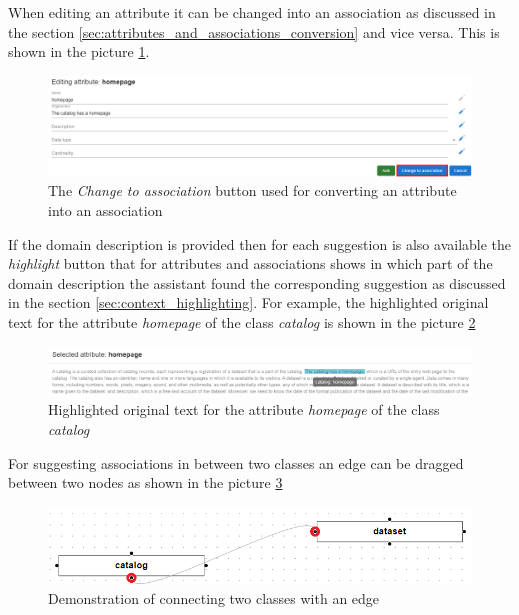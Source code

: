 When editing an attribute it can be changed into an association as discussed in the section \ref{sec:attributes_and_associations_conversion} and vice versa. This is shown in the picture \ref{fig:change_to_association}.

\begin{figure}[!h]
    \includegraphics[scale=0.36]{../docs/images/frontend/change-to-association.png}
    \caption{\centering The \textit{Change to association} button used for converting an attribute into an association}
    \label{fig:change_to_association}
\end{figure}

If the domain description is provided then for each suggestion is also available the \textit{highlight} button that for attributes and associations shows in which part of the domain description the assistant found the corresponding suggestion as discussed in the section \ref{sec:context_highlighting}. For example, the highlighted original text for the attribute \textit{homepage} of the class \textit{catalog} is shown in the picture \ref{fig:highlight_original_text}

\begin{figure}[!h]
    \includegraphics[scale=0.36]{../docs/images/frontend/highlight-original-text.png}
    \caption{\centering Highlighted original text for the attribute \textit{homepage} of the class \textit{catalog}}
    \label{fig:highlight_original_text}
\end{figure}

For suggesting associations in between two classes an edge can be dragged between two nodes as shown in the picture \ref{fig:edge_drag}

\begin{figure}[!h]
    \includegraphics[scale=0.4]{../docs/images/frontend/edge-drag.png}
    \caption{\centering Demonstration of connecting two classes with an edge}
    \label{fig:edge_drag}
\end{figure}

